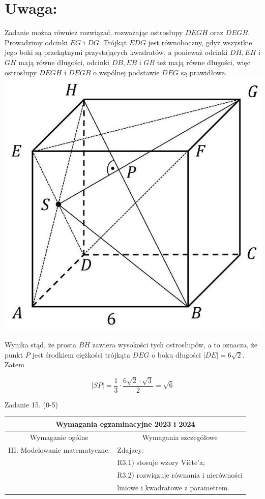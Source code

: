 \documentclass[10pt]{article}
\begin{document}
\section*{Uwaga:}
Zadanie można również rozwiązać, rozważając ostrosłupy $D E G H$ oraz $D E G B$.\\
Prowadzimy odcinki $E G$ i $D G$. Trójkąt $E D G$ jest równoboczny, gdyż wszystkie jego boki są przekątnymi przystających kwadratów, a ponieważ odcinki $D H, E H$ i $G H$ mają równe długości, odcinki $D B, E B$ i $G B$ też mają równe długości, więc ostrosłupy $D E G H$ i $D E G B$ o wspólnej podstawie $D E G$ są prawidłowe.\\
\includegraphics[max width=\textwidth, center]{2025_02_07_dcb3d059df06a3930b0ag-36}

Wynika stąd, że prosta $B H$ zawiera wysokości tych ostrosłupów, a to oznacza, że punkt $P$ jest środkiem ciężkości trójkąta $D E G$ o boku długości $|D E|=6 \sqrt{2}$. Zatem

$$
|S P|=\frac{1}{3} \cdot \frac{6 \sqrt{2} \cdot \sqrt{3}}{2}=\sqrt{6}
$$

Zadanie 15. (0-5)

\begin{center}
\begin{tabular}{|l|l|}
\hline
\multicolumn{2}{|c|}{Wymagania egzaminacyjne 2023 i 2024} \\
\hline
\multicolumn{1}{|c|}{Wymaganie ogólne} & \multicolumn{1}{|c|}{Wymagania szczegółowe} \\
\hline
III. Modelowanie matematyczne. & Zdajacy: \\
 & R3.1) stosuje wzory Viète'a; \\
 & R3.2) rozwiązuje równania i nierówności \\
 & liniowe i kwadratowe z parametrem. \\
\hline
\end{tabular}
\end{center}
\end{document}
